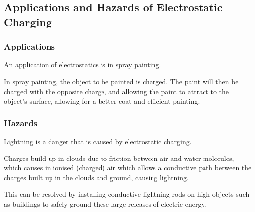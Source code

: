 \documentclass[../main.tex]{subfiles}
\begin{document}
		\subsection{Applications and Hazards of Electrostatic Charging }
		\subsubsection{Applications}
		An application of electrostatics is in spray painting.
		
		In spray painting, the object to be painted is charged. The paint will then be charged with the opposite charge, and allowing the paint to attract to the object's surface, allowing for a better coat and efficient painting.
		
		\subsubsection{Hazards}
		Lightning is a danger that is caused by electrostatic charging.
		
		Charges build up in clouds due to friction between air and water molecules, which causes in ionised (charged) air which allows a conductive path between the charges built up in the clouds and ground, causing lightning.
		
		This can be resolved by installing conductive lightning rods on high objects such as buildings to safely ground these large releases of electric energy.
\end{document}
